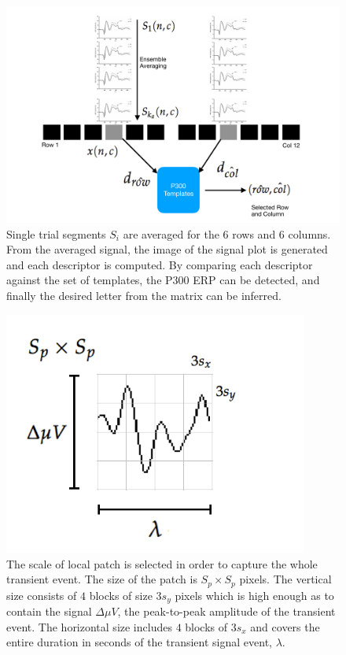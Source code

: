 \documentclass[utf8]{frontiersSCNS} %
\begin{document}
\begin{figure}[h!]
\centering
\includegraphics[width=15cm]{classificationgraph.pdf}
\caption{Single trial segments $S_i$ are averaged for the 6 rows and 6 columns. From the averaged signal, the image of the signal plot is generated and each descriptor is computed.  By comparing each descriptor against the set of templates, the P300 ERP can be detected, and finally the desired letter from the matrix can be inferred.}
\label{fig:classification}
\end{figure}

\begin{figure}[h!]
\centering
\includegraphics[width=10cm]{patchgeometry.pdf}
\caption{The scale of local patch is selected in order to capture the whole transient event.  The size of the patch is $S_p \times S_p$ pixels. The vertical size consists of $4$ blocks of size $3 s_y$ pixels which is high enough as to contain the signal $\Delta  \mu V $, the peak-to-peak amplitude of the transient event. The horizontal size includes $4$ blocks  of $3 s_x$ and covers the entire duration in seconds of the transient signal event, $ \lambda $.   }
\label{fig:patchgeometry}
\end{figure}
\end{document}
